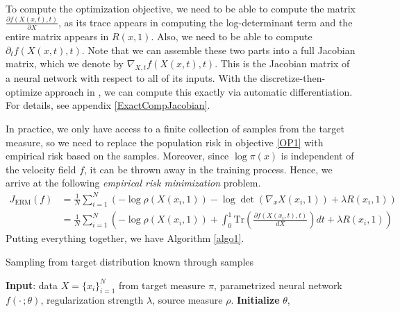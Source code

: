 To compute the optimization objective, we need to be able to compute
the matrix $\frac{\partial f(X(x,t),t)}{\partial X}$, as its trace
appears in computing the log-determinant term and the entire matrix
appears in $R(x,1)$. Also, we need to be able to compute
$\partial_tf(X(x,t),t)$. Note that we can assemble these two parts
into a full Jacobian matrix, which we denote by
$\nabla_{X,t}f(X(x,t),t)$. This is the Jacobian matrix of a neural
network with respect to all of its inputs. With the
discretize-then-optimize approach in \cite{OTFlow}, we can compute
this exactly via automatic differentiation. For details, see appendix
\ref{ExactCompJacobian}.

In practice, we only have access to a finite collection of samples
from the target measure, so we need to replace the population risk in
objective \ref{OP1} with empirical risk based on the
samples. Moreover, since $\log\pi(x)$ is independent of the velocity
field $f$, it can be thrown away in the training process. Hence, we
arrive at the following \textit{empirical risk minimization} problem.
\begin{equation}\label{ERM}
  \begin{aligned}
    J_\text{ERM}(f) &= \frac{1}{N}\sum_{i=1}^N\left( -\log\rho(X(x_i,1)) - \log\det(\nabla_x X(x_i,1)) + \lambda R(x_i,1)\right)\\
    &= \frac{1}{N}\sum_{i=1}^N\left( -\log\rho(X(x_i,1)) +
      \int_0^1\text{Tr}\left(\frac{\partial
          f(X(x_i,t),t)}{dX}\right)dt + \lambda R(x_i,1)\right)
  \end{aligned}\tag{ERM}
\end{equation}
Putting everything together, we have Algorithm \ref{algo1}.

\begin{algorithm}
  \caption{Sampling from target distribution known through samples}
  \label{algo1}
  \begin{algorithmic}[1]
    \STATE \textbf{Input}: data $X = \{ x_i\}_{i=1}^N$ from target
    measure $\pi$, parametrized neural network $f(\cdot\,; \theta)$,
    regularization strength $\lambda$, source measure $\rho$.
    \STATE\textbf{Initialize} $\theta$, 
       
     \ENDWHILE
  \end{algorithmic}
\end{algorithm}

